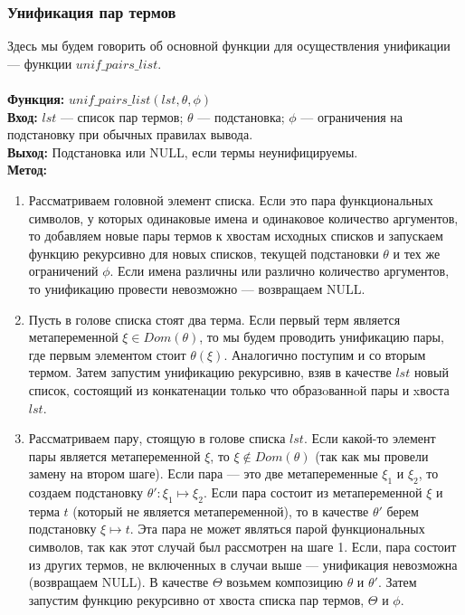 \documentclass{cw1}
\begin{document}
\subsubsection{Унификация пар термов}
\label{sec:unif_pairs_list}
Здесь мы будем говорить об основной функции для осуществления унификации --- функции
$unif\!\_pairs\!\_list$.
\\ \quad \\
\textbf{Функция:} $unif\!\_pairs\!\_list(lst,\theta,\phi)$\\
\textbf{Вход: } $lst$ --- список пар термов; $\theta$ --- подстановка; $\phi$ --- ограничения на подстановку
при обычных правилах вывода.\\
\textbf{Выход:} Подстановка или NULL, если термы неунифицируемы.\\
\textbf{Метод:}
\begin{enumerate}
 \item Рассматриваем головной элемент списка. Если это пара функциональных символов, у которых одинаковые
 имена и одинаковое количество аргументов, то добавляем новые пары термов к хвостам исходных списков и
 запускаем функцию  рекурсивно для новых списков, текущей подстановки $\theta$ и тех же ограничений $\phi$. Если имена различны или
 различно количество аргументов, то унификацию провести невозможно --- возвращаем NULL.
 \item Пусть в голове списка стоят два терма. Если первый терм является метапеременной
 $\xi \in Dom(\theta)$, то мы будем проводить унификацию пары, где первым элементом стоит $\theta(\xi)$.
 Аналогично поступим и со вторым термом. Затем запустим унификацию рекурсивно, взяв в качестве
 $lst$ новый список, состоящий из конкатенации только что образoваннoй пары и xвоста $lst$.
 \item Рассматриваем пару, стоящую в голове списка $lst$. Если какой-то элемент пары является
 метапеременной $\xi$, то $\xi\notin Dom(\theta)$ (так как мы провели замену на втором шаге).
 Если пара --- это две метапеременные $\xi_1$ и $\xi_2$, то создаем подстановку
 $\theta':\xi_1 \mapsto \xi_2$. Если пара состоит из метапеременной $\xi$ и терма $t$
 (который не является метапеременной), то в качестве $\theta'$ берем подстановку
 $\xi\mapsto t$. Эта пара не может являться парой функциональных символов, так как этот случай был рассмотрен на шаге 1.
 Если, пара состоит из других термов, не включенных в случаи выше --- унификация невозможна
 (возвращаем NULL).
 В качестве $\Theta$ возьмем композицию $\theta$ и $\theta'$.
 Затем запустим функцию рекурсивно от хвоста списка пар термов, $\Theta$ и $\phi$.

\end{enumerate}
\end{document}
